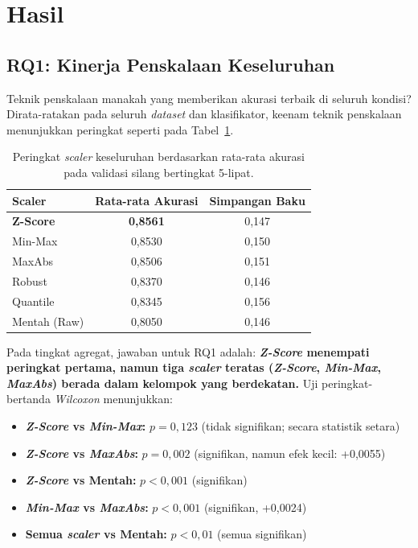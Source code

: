 \documentclass[12pt,a4paper]{article}
\begin{document}
\section{Hasil}
\label{sec:results}

\subsection{RQ1: Kinerja Penskalaan Keseluruhan}
\label{sec:rq1}

Teknik penskalaan manakah yang memberikan akurasi terbaik di seluruh kondisi?
Dirata-ratakan pada seluruh \textit{dataset} dan klasifikator, keenam teknik
penskalaan menunjukkan peringkat seperti pada Tabel~\ref{tbl:ranking}.

\begin{table}[ht]
\centering
\caption{Peringkat \textit{scaler} keseluruhan berdasarkan rata-rata akurasi
pada validasi silang bertingkat 5-lipat.}
\label{tbl:ranking}
\begin{tabular}{lcc}
\toprule
Scaler & Rata-rata Akurasi & Simpangan Baku \\
\midrule
\textbf{Z-Score} & \textbf{0,8561} & 0,147 \\
Min-Max          & 0,8530 & 0,150 \\
MaxAbs           & 0,8506 & 0,151 \\
Robust           & 0,8370 & 0,146 \\
Quantile         & 0,8345 & 0,156 \\
Mentah (Raw)     & 0,8050 & 0,146 \\
\bottomrule
\end{tabular}
\end{table}

Pada tingkat agregat, jawaban untuk RQ1 adalah: \textbf{\textit{Z-Score}
menempati peringkat pertama, namun tiga \textit{scaler} teratas
(\textit{Z-Score}, \textit{Min-Max}, \textit{MaxAbs}) berada dalam kelompok
yang berdekatan.} Uji peringkat-bertanda \textit{Wilcoxon} menunjukkan:

\begin{itemize}
  \item \textbf{\textit{Z-Score} vs \textit{Min-Max}:} $p = 0,123$
  (tidak signifikan; secara statistik setara)
  \item \textbf{\textit{Z-Score} vs \textit{MaxAbs}:} $p = 0,002$
  (signifikan, namun efek kecil: +0,0055)
  \item \textbf{\textit{Z-Score} vs Mentah:} $p < 0,001$ (signifikan)
  \item \textbf{\textit{Min-Max} vs \textit{MaxAbs}:} $p < 0,001$
  (signifikan, +0,0024)
  \item \textbf{Semua \textit{scaler} vs Mentah:} $p < 0,01$ (semua signifikan)
\end{itemize}
\end{document}

